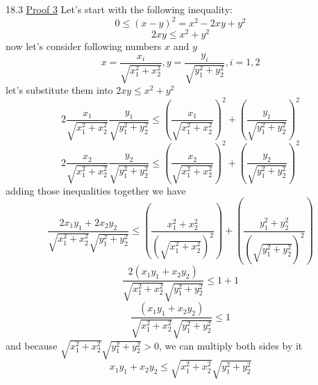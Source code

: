 \documentclass[a4paper, 11pt]{article}
\begin{document}
18.3 \underline{Proof 3} Let's start with the following inequality:
$$0 \leq (x - y)^2 = x^2 - 2xy + y^2$$ 
$$2xy \leq x^2 + y^2$$ 
now let's consider following numbers $x$ and $y$
$$x = \frac{x_i}{\sqrt{x_1^2 + x_2^2}}, y = \frac{y_i}{\sqrt{y_1^2 + y_2^2}}, i = 1, 2$$
let's substitute them into $2xy \leq x^2 + y^2$
$$2\frac{x_1}{\sqrt{x_1^2 + x_2^2}} \frac{y_1}{\sqrt{y_1^2 + y_2^2}} \leq \left(\frac{x_1}{\sqrt{x_1^2 + x_2^2}}\right)^2 + \left(\frac{y_1}{\sqrt{y_1^2 + y_2^2}}\right)^2$$
$$2\frac{x_2}{\sqrt{x_1^2 + x_2^2}} \frac{y_2}{\sqrt{y_1^2 + y_2^2}} \leq \left(\frac{x_2}{\sqrt{x_1^2 + x_2^2}}\right)^2 + \left(\frac{y_2}{\sqrt{y_1^2 + y_2^2}}\right)^2$$
adding those inequalities together we have
$$\frac{2x_1y_1 + 2x_2y_2}{\sqrt{x_1^2 + x_2^2}\sqrt{y_1^2 + y_2^2}} \leq \left(\frac{x_1^2 + x_2^2}{(\sqrt{x_1^2 + x_2^2})^2}\right) + \left(\frac{y_1^2 + y_2^2}{(\sqrt{y_1^2 + y_2^2})^2}\right)$$
$$\frac{2(x_1y_1 + x_2y_2)}{\sqrt{x_1^2 + x_2^2}\sqrt{y_1^2 + y_2^2}} \leq 1 + 1$$
$$\frac{(x_1y_1 + x_2y_2)}{\sqrt{x_1^2 + x_2^2}\sqrt{y_1^2 + y_2^2}} \leq 1$$
and because $\sqrt{x_1^2 + x_2^2}\sqrt{y_1^2 + y_2^2} > 0$, we can multiply both sides by it
$$x_1y_1 + x_2y_2 \leq \sqrt{x_1^2 + x_2^2}\sqrt{y_1^2 + y_2^2}$$
\end{document}
